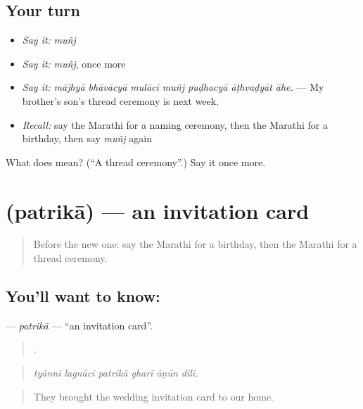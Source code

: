 \subsection*{Your turn}
\begin{itemize}
\raggedright
  \item \emph{Say it:} \emph{muñj}
  \item \emph{Say it:} \emph{muñj}, once more
  \item \emph{Say it:} \emph{mājhyā bhāvācyā mulācī muñj puḍhacyā āṭhvaḍyāt āhe.} — My brother's son's thread ceremony is next week.
  \item \emph{Recall:} say the Marathi for a naming ceremony, then the Marathi for a birthday, then say \emph{muñj} again
\end{itemize}

\begin{tcolorbox}[breakable,colback=teal!4,colframe=teal!35!black,title={Before you move on}]
What does  mean? (\textquotedblleft{}A thread ceremony\textquotedblright{}.) Say it once more.
\end{tcolorbox}
\section[\texorpdfstring{\mr{पत्रिका} (patrikā)}{पत्रिका (patrikā)}]{ (patrikā) — an invitation card}

\label{lesson:MR-C318-patrika}



\begin{quote}
Before the new one: say the Marathi for a birthday, then the Marathi for a thread ceremony.
\end{quote}

\subsection*{You'll want to know: }
\textbf{} — \emph{patrikā} — \textquotedblleft{}an invitation card\textquotedblright{}.

\begin{quote}
     .
\end{quote}

\begin{quote}
\emph{tyānnī lagnācī patrikā gharī āṇūn dilī.}
\end{quote}

\begin{quote}
They brought the wedding invitation card to our home.
\end{quote}

